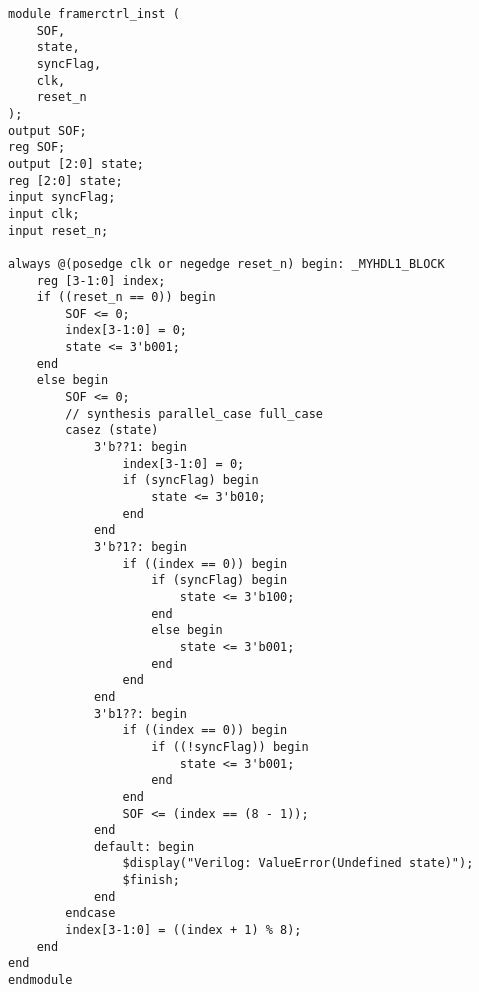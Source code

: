\begin{verbatim}
module framerctrl_inst (
    SOF,
    state,
    syncFlag,
    clk,
    reset_n
);
output SOF;
reg SOF;
output [2:0] state;
reg [2:0] state;
input syncFlag;
input clk;
input reset_n;

always @(posedge clk or negedge reset_n) begin: _MYHDL1_BLOCK
    reg [3-1:0] index;
    if ((reset_n == 0)) begin
        SOF <= 0;
        index[3-1:0] = 0;
        state <= 3'b001;
    end
    else begin
        SOF <= 0;
        // synthesis parallel_case full_case
        casez (state)
            3'b??1: begin
                index[3-1:0] = 0;
                if (syncFlag) begin
                    state <= 3'b010;
                end
            end
            3'b?1?: begin
                if ((index == 0)) begin
                    if (syncFlag) begin
                        state <= 3'b100;
                    end
                    else begin
                        state <= 3'b001;
                    end
                end
            end
            3'b1??: begin
                if ((index == 0)) begin
                    if ((!syncFlag)) begin
                        state <= 3'b001;
                    end
                end
                SOF <= (index == (8 - 1));
            end
            default: begin
                $display("Verilog: ValueError(Undefined state)");
                $finish;
            end
        endcase
        index[3-1:0] = ((index + 1) % 8);
    end
end
endmodule
\end{verbatim}


